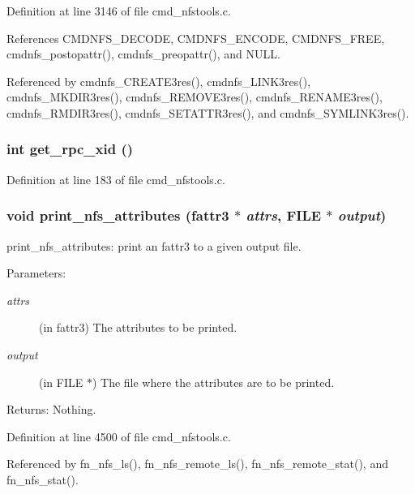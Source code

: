 Definition at line 3146 of file cmd\_\-nfstools.c.

References CMDNFS\_\-DECODE, CMDNFS\_\-ENCODE, CMDNFS\_\-FREE, cmdnfs\_\-postopattr(), cmdnfs\_\-preopattr(), and NULL.

Referenced by cmdnfs\_\-CREATE3res(), cmdnfs\_\-LINK3res(), cmdnfs\_\-MKDIR3res(), cmdnfs\_\-REMOVE3res(), cmdnfs\_\-RENAME3res(), cmdnfs\_\-RMDIR3res(), cmdnfs\_\-SETATTR3res(), and cmdnfs\_\-SYMLINK3res().
\subsubsection{\setlength{\rightskip}{0pt plus 5cm}int get\_\-rpc\_\-xid ()}\label{cmd__nfstools_8c_a58}




Definition at line 183 of file cmd\_\-nfstools.c.
\subsubsection{\setlength{\rightskip}{0pt plus 5cm}void print\_\-nfs\_\-attributes (fattr3 $\ast$ {\em attrs}, FILE $\ast$ {\em output})}\label{cmd__nfstools_8c_a120}


print\_\-nfs\_\-attributes: print an fattr3 to a given output file.

\begin{Desc}
\item[Parameters:]
\begin{description}
\item[{\em attrs}](in fattr3) The attributes to be printed. \item[{\em output}](in FILE $\ast$) The file where the attributes are to be printed. \end{description}
\end{Desc}
\begin{Desc}
\item[Returns:]Nothing. \end{Desc}


Definition at line 4500 of file cmd\_\-nfstools.c.

Referenced by fn\_\-nfs\_\-ls(), fn\_\-nfs\_\-remote\_\-ls(), fn\_\-nfs\_\-remote\_\-stat(), and fn\_\-nfs\_\-stat().
